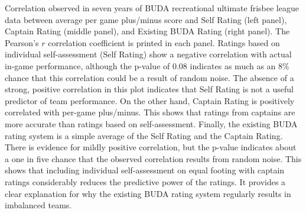 Correlation observed in seven years of BUDA recreational ultimate frisbee league data between average per game plus/minus score and Self Rating (left panel), Captain Rating (middle panel), and Existing BUDA Rating (right panel).  The Pearson's $r$ correlation coefficient is printed in each panel. Ratings based on individual self-assessment (Self Rating) show a negative correlation with actual in-game performance, although the p-value of 0.08 indicates as much as an 8\% chance that this correlation could be a result of random noise. The absence of a strong, positive correlation in this plot indicates that Self Rating is not a useful predictor of team performance. On the other hand, Captain Rating is positively correlated with per-game plus/minus. This shows that ratings from captains are more accurate than ratings based on self-assessment. Finally, the existing BUDA rating system is a simple average of the Self Rating and the Captain Rating.  There is evidence for mildly positive correlation, but the p-value indicates about a one in five chance that the observed correlation results from random noise.  This shows that including individual self-assessment on equal footing with captain ratings considerably reduces the predictive power of the ratings. It provides a clear explanation for why the existing BUDA rating system regularly results in imbalanced teams. \label{fig:correlation_self}